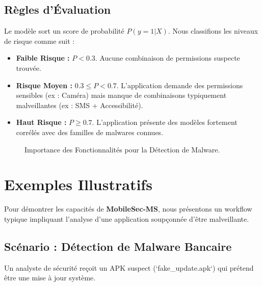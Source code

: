 \documentclass[
  journal=largetwo,
  manuscript=article-type,
  year=2025,
  volume=1,
]{cup-journal}
\begin{document}
\subsection{Règles d'Évaluation}
Le modèle sort un score de probabilité $P(y=1|X)$. Nous classifions les niveaux de risque comme suit :
\begin{itemize}
    \item \textbf{Faible Risque :} $P < 0.3$. Aucune combinaison de permissions suspecte trouvée.
    \item \textbf{Risque Moyen :} $0.3 \le P < 0.7$. L'application demande des permissions sensibles (ex : Caméra) mais manque de combinaisons typiquement malveillantes (ex : SMS + Accessibilité).
    \item \textbf{Haut Risque :} $P \ge 0.7$. L'application présente des modèles fortement corrélés avec des familles de malwares connues.
\end{itemize}

\begin{figure}[hbt!]
\centering
{}
\caption{Importance des Fonctionnalités pour la Détection de Malware.}
\label{fig:ml}
\end{figure}

\section{Exemples Illustratifs}
\label{sec:examples}

Pour démontrer les capacités de \textbf{MobileSec-MS}, nous présentons un workflow typique impliquant l'analyse d'une application soupçonnée d'être malveillante.

\subsection{Scénario : Détection de Malware Bancaire}
Un analyste de sécurité reçoit un APK suspect (`fake\_update.apk`) qui prétend être une mise à jour système.
\end{document}
